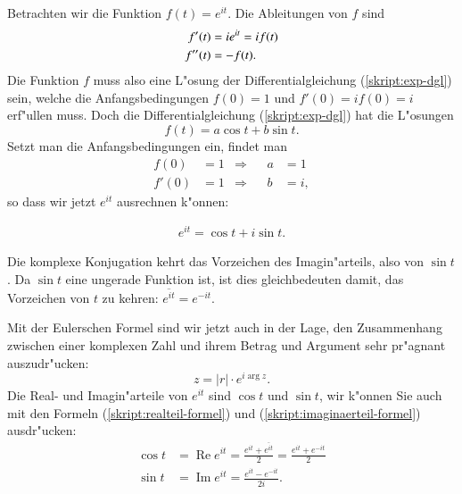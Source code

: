 Betrachten wir die Funktion $f(t)= e^{it}$. Die Ableitungen von $f$ sind
\begin{align}
f'(t)&=ie^{it}=if(t)\notag\\
f''(t)&=-f(t).\label{skript:exp-dgl}
\end{align}
Die Funktion $f$ muss also eine L"osung der Differentialgleichung
(\ref{skript:exp-dgl}) sein, welche die Anfangsbedingungen $f(0)=1$ und
$f'(0)=if(0)=i$ erf"ullen muss.
Doch die Differentialgleichung (\ref{skript:exp-dgl}) hat die L"osungen
\[
f(t)=a\cos t+b\sin t.
\]
Setzt man die Anfangsbedingungen ein, findet man
\begin{align*}
f(0)&=1&\Rightarrow&&a&=1\\
f'(0)&=1&\Rightarrow&&b&=i,
\end{align*}
so dass wir jetzt $e^{it}$ ausrechnen k"onnen:
\begin{satz}[Euler]
\begin{align}
e^{it}=\cos t+i\sin t.
\label{skript:euler-formula}
\end{align}
\end{satz}

Die komplexe Konjugation kehrt das Vorzeichen des Imagin"arteils, also 
von $\sin t$. Da $\sin t$ eine ungerade Funktion ist, ist dies gleichbedeuten
damit, das Vorzeichen von $t$ zu kehren: $\overline{e^{it}}=e^{-it}$.

Mit der Eulerschen Formel sind wir jetzt auch in der Lage, den Zusammenhang
zwischen einer komplexen Zahl und ihrem Betrag und Argument sehr pr"agnant
auszudr"ucken:
\[
z=|r|\cdot e^{i\operatorname{arg}z}.
\]
Die Real- und Imagin"arteile von $e^{it}$ sind $\cos t$ und $\sin t$,
wir k"onnen Sie auch mit den Formeln (\ref{skript:realteil-formel}) und
(\ref{skript:imaginaerteil-formel}) ausdr"ucken:
\begin{align*}
\cos t
&=
\operatorname{Re}e^{it}
=
\frac{e^{it}+\overline{e^{it}}}2
=
\frac{e^{it}+e^{-it}}2
\\
\sin t
&=
\operatorname{Im}e^{it}=\frac{e^{it}-e^{-it}}{2i}.
\end{align*}

